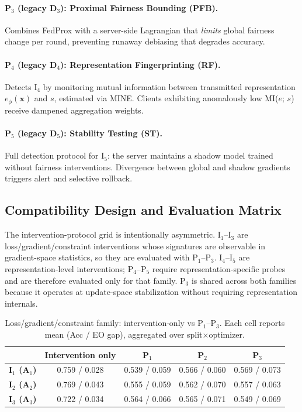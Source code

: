 ﻿\documentclass{article}
\begin{document}
\paragraph{P$_3$ (legacy D$_3$): Proximal Fairness Bounding (PFB).}
Combines FedProx with a server-side Lagrangian
that \emph{limits} global fairness change per round, preventing runaway
debiasing that degrades accuracy.

\paragraph{P$_4$ (legacy D$_4$): Representation Fingerprinting (RF).}
Detects I$_4$ by monitoring mutual information between transmitted
representation $e_{\phi}(\mathbf{x})$ and $s$, estimated via MINE.
Clients exhibiting anomalously low MI($e;\,s$) receive dampened aggregation weights.

\paragraph{P$_5$ (legacy D$_5$): Stability Testing (ST).}
Full detection protocol for I$_5$: the server maintains a shadow model
trained without fairness interventions.
Divergence between global and shadow gradients triggers alert and
selective rollback.

\subsection{Compatibility Design and Evaluation Matrix}

The intervention-protocol grid is intentionally asymmetric.
I$_1$--I$_3$ are loss/gradient/constraint interventions whose signatures
are observable in gradient-space statistics, so they are evaluated with
P$_1$--P$_3$.
I$_4$--I$_5$ are representation-level interventions; P$_4$--P$_5$
require representation-specific probes and are therefore evaluated only
for that family.
P$_3$ is shared across both families because it operates at
update-space stabilization without requiring representation internals.

\begin{table}[ht!]
  \caption{Loss/gradient/constraint family: intervention-only vs P$_1$--P$_3$.
  Each cell reports mean (Acc / EO gap), aggregated over
  split$\times$optimizer.}
  \label{tab:admatrix_shallow}
  \centering
  \small
  \setlength{\tabcolsep}{5pt}
  \begin{tabular}{lcccc}
    \toprule
    & \textbf{Intervention only} & \textbf{P$_1$} & \textbf{P$_2$} & \textbf{P$_3$} \\
    \midrule
    \textbf{I$_1$ (A$_1$)} & 0.759 / 0.028 & 0.539 / 0.059 & 0.566 / 0.060 & 0.569 / 0.073 \\
    \textbf{I$_2$ (A$_2$)} & 0.769 / 0.043 & 0.555 / 0.059 & 0.562 / 0.070 & 0.557 / 0.063 \\
    \textbf{I$_3$ (A$_3$)} & 0.722 / 0.034 & 0.564 / 0.066 & 0.565 / 0.071 & 0.549 / 0.069 \\
    \bottomrule
  \end{tabular}
\end{table}
\end{document}
